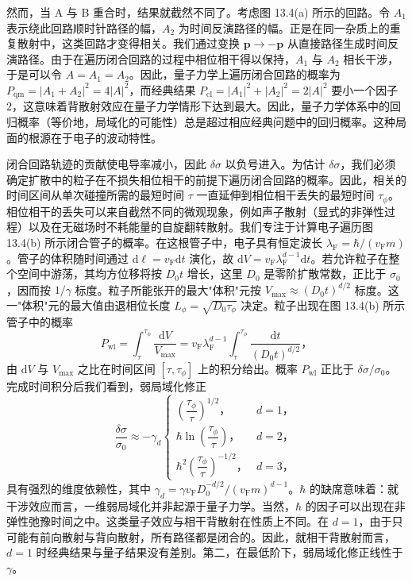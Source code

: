 然而，当 A 与 B 重合时，结果就截然不同了。考虑图 13.4(a) 所示的回路。令 $A_{1}$ 表示绕此回路顺时针路径的幅，$A_{2}$ 为时间反演路径的幅。正是在同一杂质上的重复散射中，这类回路才变得相关。我们通过变换 $\mathbf{p}\to-\mathbf{p}$ 从直接路径生成时间反演路径。由于在遍历闭合回路的过程中相位相干得以保持，$A_{1}$ 与 $A_{2}$ 相长干涉，于是可以令 $A=A_{1}=A_{2}$。因此，量子力学上遍历闭合回路的概率为 $P_{\mathrm{qm}}=|A_{1}+A_{2}|^{2}=4|A|^{2}$，而经典结果 $P_{\mathrm{cl}}=|A_{1}|^{2}+|A_{2}|^{2}=2|A|^{2}$ 要小一个因子 2，这意味着背散射效应在量子力学情形下达到最大。因此，量子力学体系中的回归概率（等价地，局域化的可能性）总是超过相应经典问题中的回归概率。这种局面的根源在于电子的波动特性。

闭合回路轨迹的贡献使电导率减小，因此 $\delta\sigma$ 以负号进入。为估计 $\delta\sigma$，我们必须确定扩散中的粒子在不损失相位相干的前提下遍历闭合回路的概率。因此，相关的时间区间从单次碰撞所需的最短时间 $\tau$ 一直延伸到相位相干丢失的最短时间 $\tau_{\phi}$。相位相干的丢失可以来自截然不同的微观现象，例如声子散射（显式的非弹性过程）以及在无磁场时不耗能量的自旋翻转散射。我们专注于计算电子遍历图 13.4(b) 所示闭合管子的概率。在这根管子中，电子具有恒定波长 $\lambda_{\mathrm{F}}=\hbar/(v_{\mathrm{F}}m)$。管子的体积随时间通过 $\mathrm{d}\ell=v_{\mathrm{F}}\mathrm{d}t$ 演化，故 $\mathrm{d}V=v_{\mathrm{F}}\lambda_{\mathrm{F}}^{d-1}\mathrm{d}t$。若允许粒子在整个空间中游荡，其均方位移将按 $D_{0}t$ 增长，这里 $D_{0}$ 是零阶扩散常数，正比于 $\sigma_{0}$，因而按 $1/\gamma$ 标度。粒子所能张开的最大"体积"元按 $V_{\mathrm{max}}\approx(D_{0}t)^{d/2}$ 标度。这一"体积"元的最大值由退相位长度 $L_{\phi}=\sqrt{D_{0}\tau_{\phi}}$ 决定。粒子出现在图 13.4(b) 所示管子中的概率
\begin{equation*}
P_{\mathrm{wl}}=\int_{\tau}^{\tau_{\phi}}\frac{\mathrm{d}V}{V_{\mathrm{max}}}=v_{\mathrm{F}}\lambda_{\mathrm{F}}^{d-1}\int_{\tau}^{\tau_{\phi}}\frac{\mathrm{d}t}{(D_{0}t)^{d/2}}\text{，}\tag{13.16}
\end{equation*}
由 $\mathrm{d}V$ 与 $V_{\mathrm{max}}$ 之比在时间区间 $[\tau,\tau_{\phi}]$ 上的积分给出。概率 $P_{\mathrm{wl}}$ 正比于 $\delta\sigma/\sigma_{0}$。完成时间积分后我们看到，弱局域化修正
\begin{equation*}
\frac{\delta\sigma}{\sigma_{0}}\approx-\gamma_{d}
\begin{cases}
\left(\dfrac{\tau_{\phi}}{\tau}\right)^{1/2}\text{，} & d=1\text{，}\\[8pt]
\hbar\ln\left(\dfrac{\tau_{\phi}}{\tau}\right)\text{，} & d=2\text{，}\\[8pt]
\hbar^{2}\left(\dfrac{\tau_{\phi}}{\tau}\right)^{-1/2}\text{，} & d=3\text{，}
\end{cases}\tag{13.17}
\end{equation*}
具有强烈的维度依赖性，其中 $\gamma_{d}=\gamma v_{\mathrm{F}}D_{0}^{-d/2}/(v_{\mathrm{F}}m)^{d-1}$。$\hbar$ 的缺席意味着：就干涉效应而言，一维弱局域化并非起源于量子力学。当然，$\hbar$ 的因子可以出现在非弹性弛豫时间之中。这类量子效应与相干背散射在性质上不同。在 $d=1$，由于只可能有前向散射与背向散射，所有路径都是闭合的。因此，就相干背散射而言，$d=1$ 时经典结果与量子结果没有差别。第二，在最低阶下，弱局域化修正线性于 $\gamma$。

